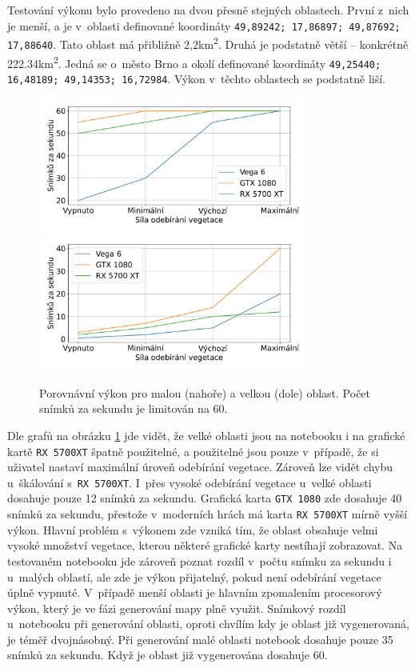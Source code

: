 Testování výkonu bylo provedeno na dvou přesně stejných oblastech. První z~nich je menší, a je v~oblasti definované koordináty \verb|49,89242; 17,86897; 49,87692; 17,88640|. Tato oblast má přibližně 2,2km\textsuperscript{2}. Druhá je podstatně větší -- konkrétně 222.34km\textsuperscript{2}. Jedná se o~město Brno a okolí definované koordináty \verb|49,25440; 16,48189; 49,14353; 16,72984|. Výkon v~těchto oblastech se podstatně liší.

\begin{figure}[H]
	\centering
	\includegraphics[width=24em]{images/impl/small_area.pdf}
	\includegraphics[width=24em]{images/impl/big_area.pdf}
	\caption[caption]{Porovnávní výkon pro malou (nahoře) a velkou (dole) oblast. Počet snímků za sekundu je limitován na 60.} 
	\label{fps-graphs}
\end{figure}

Dle grafů na obrázku \ref{fps-graphs} jde vidět, že velké oblasti jsou na notebooku i na grafické kartě \verb|RX 5700XT| špatně použitelné, a použitelné jsou pouze v~případě, že si uživatel nastaví maximální úroveň odebírání vegetace. Zároveň lze vidět chybu u~škálování s~\verb|RX 5700XT|. I~přes vysoké odebírání vegetace u~velké oblasti dosahuje pouze 12 snímků za sekundu. Grafická karta \verb|GTX 1080| zde dosahuje 40 snímků za sekundu, přestože v~moderních hrách má karta \verb|RX 5700XT| mírně vyšší výkon. Hlavní problém s~výkonem zde vzniká tím, že oblast obsahuje velmi vysoké množství vegetace, kterou některé grafické karty nestíhají zobrazovat. Na testovaném notebooku jde zároveň poznat rozdíl v~počtu snímku za sekundu i u~malých oblastí, ale zde je výkon přijatelný, pokud není odebírání vegetace úplně vypnuté. V~případě menší oblasti je hlavním zpomalením procesorový výkon, který je ve fázi generování mapy plně využit. Snímkový rozdíl u~notebooku při generování oblasti, oproti chvílím kdy je oblast již vygenerovaná, je téměř dvojnásobný. Při generování malé oblasti notebook dosahuje pouze 35 snímků za sekundu. Když je oblast již vygenerována dosahuje 60.


